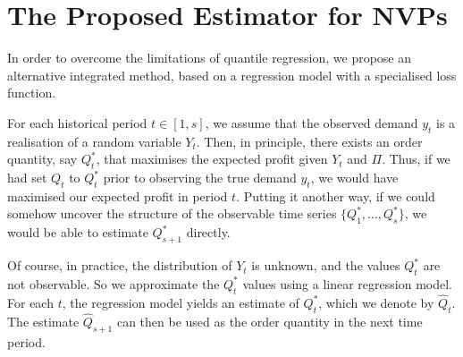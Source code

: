 \documentclass{article}
\begin{document}
\section{The Proposed Estimator for NVPs} \label{se:new}

In order to overcome the limitations of quantile regression, we propose an alternative integrated method, based on a regression model with a specialised loss function.

For each historical period $t\in [1,s]$, we assume that the observed demand $y_t$ is a realisation of a random variable $Y_t$. Then, in principle, there exists an order quantity, say $Q_t^*$, that maximises the expected profit given $Y_t$ and $\Pi$. Thus, if we had set $Q_t$ to $Q_t^*$ prior to observing the true demand $y_t$, we would have maximised our expected profit in period $t$. Putting it another way, if we could somehow uncover the structure of the observable time series $\big\{ Q_1^*,\dots,Q_s^* \big\}$, we would be able to estimate $Q_{s+1}^*$ directly.

Of course, in practice, the distribution of $Y_t$ is unknown, and the values $Q_t^*$ are not observable. So we approximate the $Q_t^*$ values using a linear regression model. For each $t$, the regression model yields an estimate of $Q^*_t$, which we denote by $\hat{Q}_t$. The estimate $\hat{Q}_{s+1}$ can then be used as the order quantity in the next time period.
\end{document}
